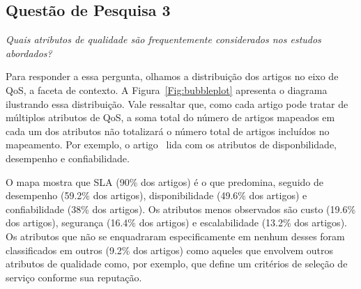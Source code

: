 \subsection{Quest\~{a}o de Pesquisa 3}
\emph{Quais atributos de qualidade são frequentemente considerados nos estudos abordados?}

Para responder a essa pergunta, olhamos a distribui\c{c}\~{a}o dos artigos no eixo de QoS, a faceta de contexto. A Figura~\ref{Fig:bubbleplot} apresenta o diagrama ilustrando essa distribui\c{c}\~{a}o. Vale ressaltar que, como cada artigo pode tratar de m\'{u}ltiplos atributos de QoS, a soma total do n\'{u}mero de artigos mapeados em cada um dos atributos n\~{a}o totalizar\'{a} o n\'{u}mero total de artigos inclu\'{i}dos no mapeamento. Por exemplo, o artigo~\cite{DBLP:journals/tse/CalinescuGKMT11} lida com os atributos de disponbilidade, desempenho e confiabilidade. 

O mapa mostra que SLA (90\% dos artigos) \'{e} o que predomina, seguido de desempenho (59.2\% dos artigos), disponibilidade (49.6\% dos artigos) e confiabilidade (38\% dos artigos). Os atributos menos observados s\~{a}o custo (19.6\% dos artigos), seguran\c{c}a (16.4\% dos artigos) e escalabilidade (13.2\% dos artigos). Os atributos que n\~{a}o se enquadraram especificamente em nenhum desses foram classificados em outros (9.2\% dos artigos) como aqueles que envolvem outros atributos de qualidade como, por exemplo, \cite{6036406} que define um crit\'{e}rios de sele\c{c}\~{a}o de servi\c{c}o conforme sua reputa\c{c}\~{a}o. 
